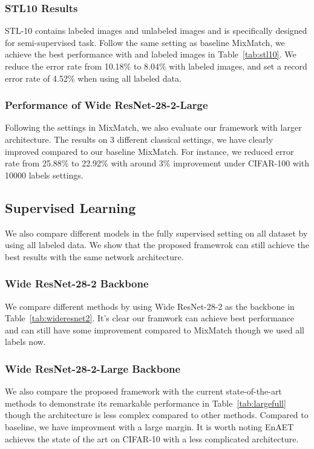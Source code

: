 \documentclass[journal]{IEEEtran}
\begin{document}
\subsubsection{STL10 Results}
STL-10 contains  labeled images and  unlabeled images and is specifically designed for semi-supervised task.
Follow the same setting as baseline MixMatch, we achieve the best performance with  and  labeled images in Table~\ref{tab:stl10}. We reduce the error rate from 10.18\% to 8.04\% with  labeled images, and set a record error rate of 4.52\% when using all labeled data.


\subsubsection{Performance of Wide ResNet-28-2-Large}
Following the settings in MixMatch, we also evaluate our framework with larger architecture. The results on 3 different classical settings, we have clearly improved compared to our baseline MixMatch. For instance, we reduced error rate from 25.88\% to 22.92\% with around 3\% improvement under CIFAR-100 with 10000 labels settings.


\subsection{Supervised Learning}
\label{sec:sl}
We also compare different models in the fully supervised setting on all dataset by using all labeled data. We show that the proposed framewrok can still achieve the best results with the same network architecture.
\subsubsection{Wide ResNet-28-2 Backbone}

We compare different methods by using Wide ResNet-28-2 as the backbone in Table~\ref{tab:wideresnet2}. It's clear our framwork can achieve best performance and can still have some improvement compared to MixMatch though we used all labels now.


\subsubsection{Wide ResNet-28-2-Large Backbone} We also compare the proposed framework with the current state-of-the-art methods to demonstrate its remarkable performance in Table~\ref{tab:largefull} though the architecture is less complex compared to other methods. Compared to baseline, we have improvment with a large margin. It is worth noting EnAET achieves the state of the art on CIFAR-10 with a less complicated architecture.
\end{document}

